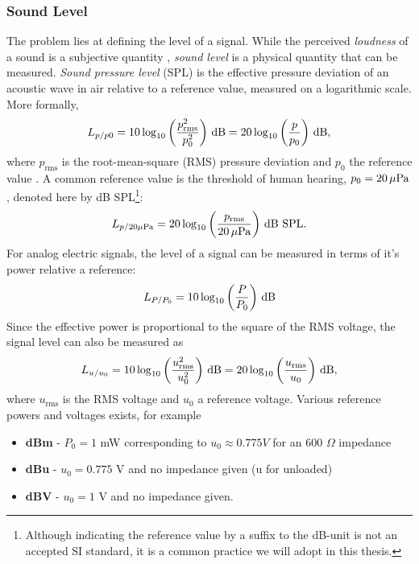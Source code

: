 \documentclass[../main2.tex]{subfiles}
\begin{document}
\subsubsection{Sound Level}
The problem lies at defining the level of a signal. While the perceived \emph{loudness} of a sound is a subjective quantity \cite{american1973american}, \emph{sound level} is a physical quantity that can be measured. \emph{Sound pressure level} (SPL) is the effective pressure deviation of an acoustic wave in air relative to a reference value, measured on a logarithmic scale. More formally,
\begin{equation}
L_{p/p0} = 10 \log_{10} \left( \frac{p_\text{rms}^2}{p_0^2} \right) \mskip3mu\text{dB} = 20 \log_{10} \left( \frac{p}{p_0} \right) \mskip3mu\text{dB},
\end{equation}
where $p_\text{rms}$ is the root-mean-square (RMS) pressure deviation and $p_0$ the reference value \cite{XXXXX}. A common reference value is the threshold of human hearing, $p_0 = 20 \mskip3mu\mu\text{Pa}$ \cite{XXXX}, denoted here by dB SPL\footnote{Although indicating the reference value by a suffix to the dB-unit is not an accepted SI standard, it is a common practice we will adopt in this thesis.}:
\begin{equation}
L_{p/20 \mu\text{Pa}} = 20 \log_{10} \left( \frac{p_\text{rms}}{20 \mskip3mu\mu\text{Pa}} \right) \mskip3mu\text{dB SPL}.
\end{equation}
For analog electric signals, the level of a signal can be measured in terms of it's power relative a reference:
\begin{equation}
L_{P/P_0} = 10 \log_{10} \left( \frac{P}{P_0} \right) \mskip3mu\text{dB}
\end{equation}
Since the effective power is proportional to the square of the RMS voltage, the signal level can also be measured as
\begin{equation}
L_{u/u_0} = 10 \log_{10} \left( \frac{u_\text{rms}^2}{u_0^2} \right) \mskip3mu\text{dB} = 20 \log_{10} \left( \frac{u_\text{rms}}{u_0} \right) \mskip3mu\text{dB},
\end{equation}
where $u_\text{rms}$ is the RMS voltage and $u_0$ a reference voltage. Various reference powers and voltages exists, for example 
\begin{itemize}
\item \textbf{dBm} - $P_0 = 1$ mW corresponding to $u_0 \approx 0.775 V$ for an 600 $\Omega$ impedance
\item \textbf{dBu} - $u_0 = 0.775$ V and no impedance given (u for unloaded)
\item \textbf{dBV} - $u_0 = 1$ V and no impedance given.
\end{itemize}
\end{document}
